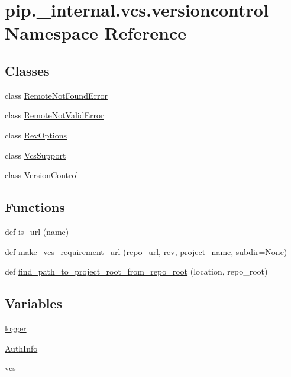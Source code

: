 \hypertarget{namespacepip_1_1__internal_1_1vcs_1_1versioncontrol}{}\section{pip.\+\_\+internal.\+vcs.\+versioncontrol Namespace Reference}
\label{namespacepip_1_1__internal_1_1vcs_1_1versioncontrol}
\subsection*{Classes}
\begin{DoxyCompactItemize}
\item 
class \hyperlink{classpip_1_1__internal_1_1vcs_1_1versioncontrol_1_1RemoteNotFoundError}{Remote\+Not\+Found\+Error}
\item 
class \hyperlink{classpip_1_1__internal_1_1vcs_1_1versioncontrol_1_1RemoteNotValidError}{Remote\+Not\+Valid\+Error}
\item 
class \hyperlink{classpip_1_1__internal_1_1vcs_1_1versioncontrol_1_1RevOptions}{Rev\+Options}
\item 
class \hyperlink{classpip_1_1__internal_1_1vcs_1_1versioncontrol_1_1VcsSupport}{Vcs\+Support}
\item 
class \hyperlink{classpip_1_1__internal_1_1vcs_1_1versioncontrol_1_1VersionControl}{Version\+Control}
\end{DoxyCompactItemize}
\subsection*{Functions}
\begin{DoxyCompactItemize}
\item 
def \hyperlink{namespacepip_1_1__internal_1_1vcs_1_1versioncontrol_a885afc288d59bd52197f024fa2fb779c}{is\+\_\+url} (name)
\item 
def \hyperlink{namespacepip_1_1__internal_1_1vcs_1_1versioncontrol_a265172f9a4e7f3bcb35d2a8a001e8805}{make\+\_\+vcs\+\_\+requirement\+\_\+url} (repo\+\_\+url, rev, project\+\_\+name, subdir=None)
\item 
def \hyperlink{namespacepip_1_1__internal_1_1vcs_1_1versioncontrol_ab0f358451f1fa92e9ec1816a1db5b667}{find\+\_\+path\+\_\+to\+\_\+project\+\_\+root\+\_\+from\+\_\+repo\+\_\+root} (location, repo\+\_\+root)
\end{DoxyCompactItemize}
\subsection*{Variables}
\begin{DoxyCompactItemize}
\item 
\hyperlink{namespacepip_1_1__internal_1_1vcs_1_1versioncontrol_a5985b711475a83d999df91dc2d1a992d}{logger}
\item 
\hyperlink{namespacepip_1_1__internal_1_1vcs_1_1versioncontrol_abd1a73ed07725a5cd6bd41f2e288be76}{Auth\+Info}
\item 
\hyperlink{namespacepip_1_1__internal_1_1vcs_1_1versioncontrol_abe0917d729e813375fa39966f4eea0f3}{vcs}
\end{DoxyCompactItemize}


